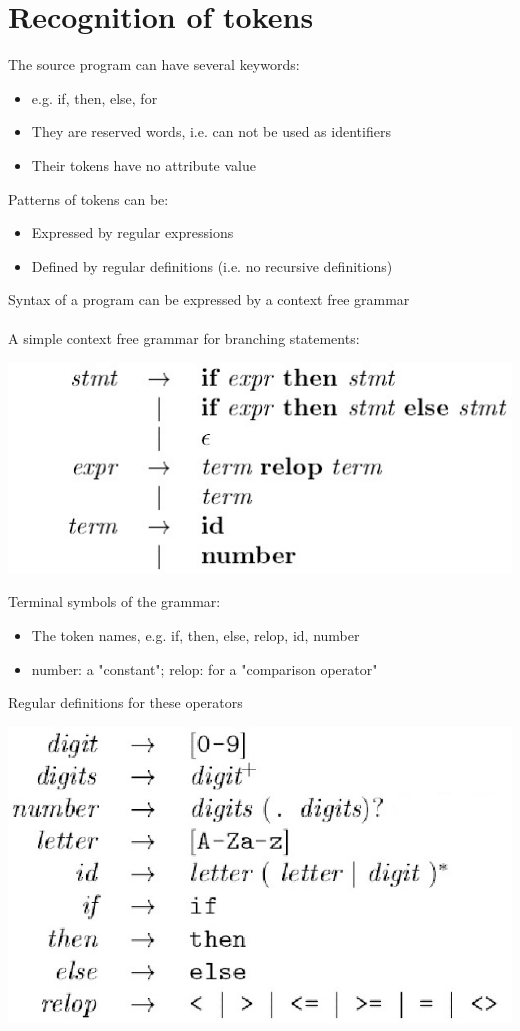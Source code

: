 \documentclass{article}[18pt]
\begin{document}
\section{Recognition of tokens}
The source program can have several keywords:
\begin{itemize}
	\item e.g. if, then, else, for
	\item They are reserved words, i.e. can not be used as identifiers
	\item Their tokens have no attribute value
\end{itemize}
Patterns of tokens can be:
\begin{itemize}
	\item Expressed by regular expressions
	\item Defined by regular definitions (i.e. no recursive definitions)
\end{itemize}
Syntax of a program can be expressed by a context free grammar\\
\\
A simple context free grammar for branching statements:
\begin{center}
	\includegraphics[scale=0.5]{context-free-grammar}
\end{center}
Terminal symbols of the grammar:
\begin{itemize}
	\item The token names, e.g. if, then, else, relop, id, number
	\item number: a "constant"; relop: for a "comparison operator"
\end{itemize}
Regular definitions for these operators
\begin{center}
	\includegraphics[scale=0.5]{"regular definitions"}
\end{center}
\end{document}
